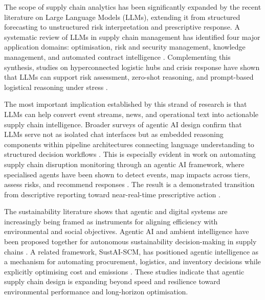 The scope of supply chain analytics has been significantly expanded by the recent literature on Large Language Models (\gls{LLM}s), extending it from structured forecasting to unstructured risk interpretation and prescriptive response. A systematic review of LLMs in supply chain management has identified four major application domains: optimisation, risk and security management, knowledge management, and automated contract intelligence \cite{QuHuIvanov2026}. Complementing this synthesis, studies on hyperconnected logistic hubs and crisis response have shown that LLMs can support risk assessment, zero-shot reasoning, and prompt-based logistical reasoning under stress \cite{ZhaoSunLiu2025}.

The most important implication established by this strand of research is that LLMs can help convert event streams, news, and operational text into actionable supply chain intelligence. Broader surveys of agentic AI design confirm that LLMs serve not as isolated chat interfaces but as embedded reasoning components within pipeline architectures connecting language understanding to structured decision workflows \cite{HughesEtAl2025}. This is especially evident in work on automating supply chain disruption monitoring through an agentic AI framework, where specialised agents have been shown to detect events, map impacts across tiers, assess risks, and recommend responses \cite{AlMahriEtAl2026}. The result is a demonstrated transition from descriptive reporting toward near-real-time prescriptive action \cite{AlMahriEtAl2026}.

The sustainability literature shows that agentic and digital systems are increasingly being framed as instruments for aligning efficiency with environmental and social objectives. Agentic AI and ambient intelligence have been proposed together for autonomous sustainability decision-making in supply chains \cite{Tathavadekar2025}. A related framework, SustAI-SCM, has positioned agentic intelligence as a mechanism for automating procurement, logistics, and inventory decisions while explicitly optimising cost and emissions \cite{Aylak2025}. These studies indicate that agentic supply chain design is expanding beyond speed and resilience toward environmental performance and long-horizon optimisation.

